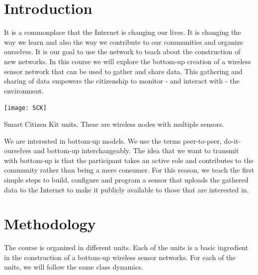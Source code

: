\documentclass{tufte-book} %
\begin{document}


\cleardoublepage
\chapter{Introduction} %

It is a commonplace that the Internet is changing our lives.
It is changing the way we learn and also the way we contribute to our communities and organize ourselves.
It is our goal to use the network to teach about the construction of new networks.
In this course we will explore the bottom-up creation of a wireless sensor network that can be used to gather and share data.
This gathering and sharing of data empowers the citizenship to monitor - and interact with - the environment.

\begin{marginfigure}
\texttt{[image: SCK]}
\caption{Smart Citizen Kit units. These are wireless nodes with multiple sensors.}
\label{fig:SCK}
\end{marginfigure}

We are interested in bottom-up models.
We use the terms peer-to-peer, do-it-ourselves and bottom-up interchangeably.
The idea that we want to transmit with bottom-up is that the participant takes an active role and contributes to the community rather than being a mere consumer.
For this reason, we teach the first simple steps to build, configure and program a sensor that uploads the gathered data to the Internet to make it publicly available to those that are interested in.


\chapter{Methodology}

The course is organized in different units.
Each of the units is a basic ingredient in the construction of a bottom-up wireless sensor networks.
For each of the units, we will follow the same class dynamics.
\end{document}
